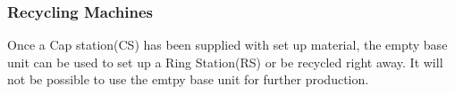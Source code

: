 \documentclass[12pt,twoside]{article}
\newcommand{\refsec}[1]{Section~\ref{#1}}
\begin{document}
%
%


\subsubsection{Recycling Machines}
Once a Cap station(CS) has been supplied with set up material, the empty base unit can be used to set up a Ring Station(RS) or be recycled right away. It will not be possible to use the emtpy base unit for further production.
\end{document}

